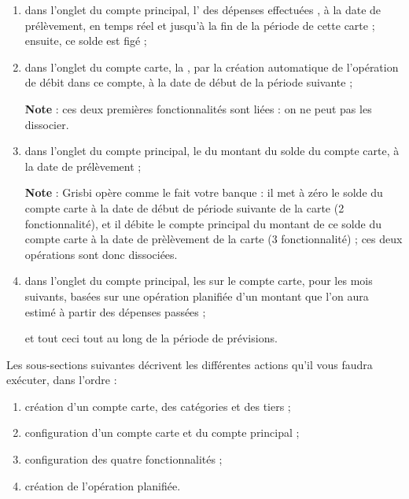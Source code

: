 \begin{enumerate}
	 		\item dans l'onglet  du compte principal, l' des dépenses effectuées , à la date de prélèvement, en temps réel et jusqu'à la fin de la période de cette carte ; ensuite, ce solde est figé ;
	 		\item dans l'onglet  du compte carte, la , par la création automatique de l'opération de débit dans ce compte, à la date de début de la période suivante ;

			\textbf{Note} : ces deux premières fonctionnalités sont liées : on ne peut pas les dissocier.	
			\item dans l'onglet  du compte principal, le  du montant du solde du compte carte, à la date de prélèvement ;

			\textbf{Note} : Grisbi opère comme le fait votre banque : il met à zéro le solde du compte carte à la date de début de période suivante de la carte (2 fonctionnalité), et il débite le compte principal du montant de ce solde du compte carte à la date de prèlèvement de la carte (3 fonctionnalité) ; ces deux opérations sont donc dissociées. 
			 		
 	 \item dans l'onglet  du compte principal, les  sur le compte carte, pour les mois suivants, basées sur une opération planifiée d'un montant que l'on aura estimé à partir des dépenses passées ;

et tout ceci tout au long de la période de prévisions.			 
\end{enumerate}

Les sous-sections suivantes décrivent les différentes actions qu'il vous faudra exécuter, dans l'ordre :

\begin{enumerate}
	\item création d'un compte carte, des catégories et des tiers ;
	\item configuration d'un compte carte et du compte principal ;
	\item configuration des quatre fonctionnalités ;
	\item création de l'opération planifiée.
\end{enumerate}  


